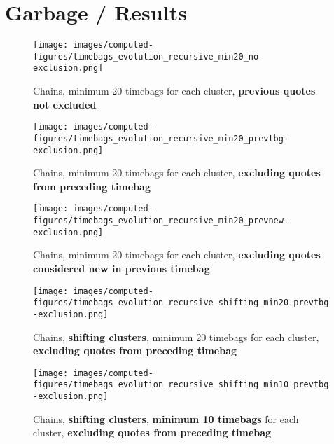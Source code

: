 \section*{Garbage / Results}\label{sec:results}

\begin{figure*}[!th]
    \centering
    \texttt{[image: images/computed-figures/timebags\_evolution\_recursive\_min20\_no-exclusion.png]}
    \caption{Chains, minimum 20 timebags for each cluster, \textbf{previous quotes not excluded}}
    \label{fig:timebags-evolution}
\end{figure*}

\begin{figure*}[!th]
    \centering
    \texttt{[image: images/computed-figures/timebags\_evolution\_recursive\_min20\_prevtbg-exclusion.png]}
    \caption{Chains, minimum 20 timebags for each cluster, \textbf{excluding quotes from preceding timebag}}
    \label{fig:timebags-evolution}
\end{figure*}

\begin{figure*}[!th]
    \centering
    \texttt{[image: images/computed-figures/timebags\_evolution\_recursive\_min20\_prevnew-exclusion.png]}
    \caption{Chains, minimum 20 timebags for each cluster, \textbf{excluding quotes considered new in previous timebag}}
    \label{fig:timebags-evolution}
\end{figure*}

\begin{figure*}[!th]
    \centering
    \texttt{[image: images/computed-figures/timebags\_evolution\_recursive\_shifting\_min20\_prevtbg-exclusion.png]}
    \caption{Chains, \textbf{shifting clusters}, minimum 20 timebags for each cluster, \textbf{excluding quotes from preceding timebag}}
    \label{fig:timebags-evolution}
\end{figure*}

\begin{figure*}[!th]
    \centering
    \texttt{[image: images/computed-figures/timebags\_evolution\_recursive\_shifting\_min10\_prevtbg-exclusion.png]}
    \caption{Chains, \textbf{shifting clusters}, \textbf{minimum 10 timebags} for each cluster, \textbf{excluding quotes from preceding timebag}}
    \label{fig:timebags-evolution}
\end{figure*}

